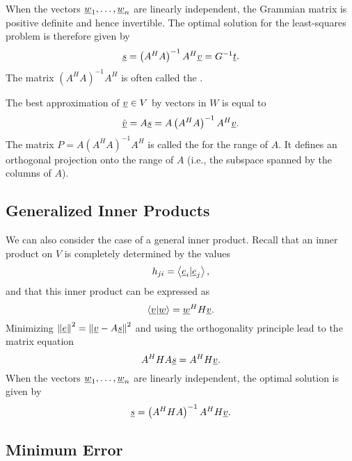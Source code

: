 When the vectors $\underline{w}_1, \ldots, \underline{w}_n$ are linearly independent, the Grammian matrix is positive definite and hence invertible.
The optimal solution for the least-squares problem is therefore given by
\begin{equation*}
\underline{s} = \left( A^H A \right)^{-1} A^H \underline{v} = G^{-1} \underline{t} .
\end{equation*}
The matrix $\left( A^H A \right)^{-1} A^H$ is often called the .

The best approximation of $\underline{v} \in V$ by vectors in $W$ is equal to
\begin{equation*}
\hat{\underline{v}} = A \underline{s} = A \left( A^H A \right)^{-1} A^H \underline{v} .
\end{equation*}
The matrix $P = A \left( A^H A \right)^{-1} A^H$ is called the  for the range of $A$.
It defines an orthogonal projection onto the range of $A$ (i.e., the subspace spanned by the columns of $A$).


\subsection{Generalized Inner Products}

We can also consider the case of a general inner product.
Recall that an inner product on $V$ is completely determined by the values
\begin{equation*}
h_{ji} = \left\langle \underline{e}_i | \underline{e}_j \right\rangle ,
\end{equation*}
and that this inner product can be expressed as
\begin{equation*}
\left\langle \underline{v} | \underline{w} \right\rangle
= \underline{w}^H H \underline{v}.
\end{equation*}
Minimizing $\left\| \underline{e} \right\|^2 = \left\| \underline{v} - A \underline{s} \right\|^2$ and using the orthogonality principle lead to the matrix equation
\begin{equation*}
A^H H A \underline{s} = A^H H \underline{v}.
\end{equation*}
When the vectors $\underline{w}_1, \ldots, \underline{w}_n$ are linearly independent, the optimal solution is given by
\begin{equation*}
\underline{s} = \left( A^H H A \right)^{-1} A^H H \underline{v}.
\end{equation*}


\subsection{Minimum Error}

